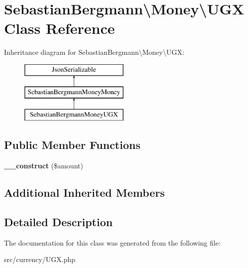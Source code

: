 \hypertarget{classSebastianBergmann_1_1Money_1_1UGX}{}\section{Sebastian\+Bergmann\textbackslash{}Money\textbackslash{}U\+G\+X Class Reference}
\label{classSebastianBergmann_1_1Money_1_1UGX}
Inheritance diagram for Sebastian\+Bergmann\textbackslash{}Money\textbackslash{}U\+G\+X\+:\begin{figure}[H]
\begin{center}
\leavevmode
\includegraphics[height=3.000000cm]{classSebastianBergmann_1_1Money_1_1UGX}
\end{center}
\end{figure}
\subsection*{Public Member Functions}
\begin{DoxyCompactItemize}
\item 
\hypertarget{classSebastianBergmann_1_1Money_1_1UGX_ade269d5be1ab35cf1fc8f5a523b40ca6}{}{\bfseries \+\_\+\+\_\+construct} (\$amount)\label{classSebastianBergmann_1_1Money_1_1UGX_ade269d5be1ab35cf1fc8f5a523b40ca6}

\end{DoxyCompactItemize}
\subsection*{Additional Inherited Members}


\subsection{Detailed Description}


The documentation for this class was generated from the following file\+:\begin{DoxyCompactItemize}
\item 
src/currency/U\+G\+X.\+php\end{DoxyCompactItemize}
